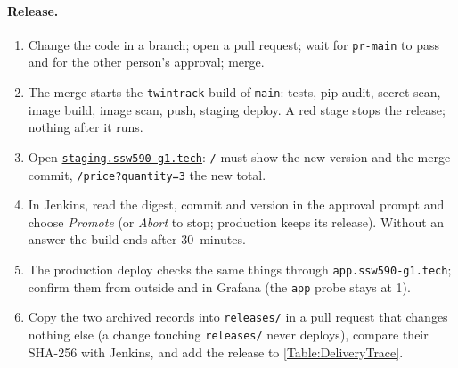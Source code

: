\paragraph{Release.}
\begin{enumerate}
\item Change the code in a branch; open a pull request; wait for \texttt{pr-main} to pass and for the other person's approval; merge.
\item The merge starts the \texttt{twintrack} build of \texttt{main}: tests, pip-audit, secret scan, image build, image scan, push, staging deploy. A red stage stops the release; nothing after it runs.
\item Open \href{https://staging.ssw590-g1.tech/}{\texttt{staging.ssw590-g1.tech}}: \texttt{/} must show the new version and the merge commit, \texttt{/price?quantity=3} the new total.
\item In Jenkins, read the digest, commit and version in the approval prompt and choose \emph{Promote} (or \emph{Abort} to stop; production keeps its release). Without an answer the build ends after 30~minutes.
\item The production deploy checks the same things through \texttt{app.ssw590-g1.tech}; confirm them from outside and in Grafana (the \texttt{app} probe stays at 1).
\item Copy the two archived records into \texttt{releases/} in a pull request that changes nothing else (a change touching \texttt{releases/} never deploys), compare their SHA-256 with Jenkins, and add the release to \ref{Table:DeliveryTrace}.
\end{enumerate}

